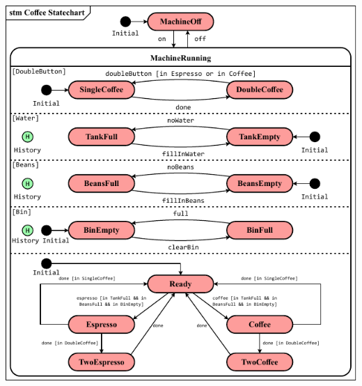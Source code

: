 \begin{center}
    \includegraphics[width=\columnwidth]{images/statechart_example_coffeemachine.pdf}
\end{center}

